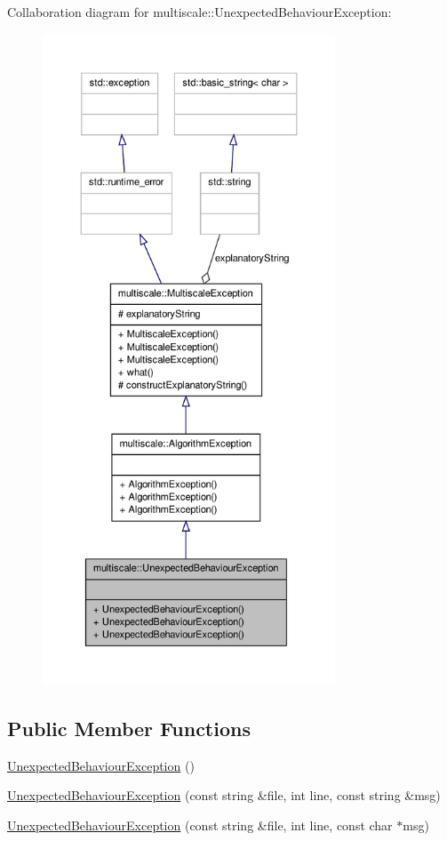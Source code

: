 \-Collaboration diagram for multiscale\-:\-:\-Unexpected\-Behaviour\-Exception\-:
\nopagebreak
\begin{figure}[H]
\begin{center}
\leavevmode
\includegraphics[height=550pt]{classmultiscale_1_1UnexpectedBehaviourException__coll__graph}
\end{center}
\end{figure}
\subsection*{\-Public \-Member \-Functions}
\begin{DoxyCompactItemize}
\item 
\hyperlink{classmultiscale_1_1UnexpectedBehaviourException_ab7d8f94650407dd350e109e3362e3c4c}{\-Unexpected\-Behaviour\-Exception} ()
\item 
\hyperlink{classmultiscale_1_1UnexpectedBehaviourException_a99903f4c6c5f1746cb15f0ccf2c1233b}{\-Unexpected\-Behaviour\-Exception} (const string \&file, int line, const string \&msg)
\item 
\hyperlink{classmultiscale_1_1UnexpectedBehaviourException_adc0d1294e28ffd3eed251a60832d43bc}{\-Unexpected\-Behaviour\-Exception} (const string \&file, int line, const char $\ast$msg)
\end{DoxyCompactItemize}


